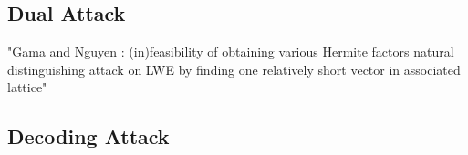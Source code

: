 














\subsection{Dual Attack \cite{MR09}}
"Gama and Nguyen \cite{GN08b}: (in)feasibility of obtaining various Hermite factors
natural distinguishing attack on LWE by finding one relatively short vector in associated lattice"




\subsection{Decoding Attack \cite{LP11}} \label{sec:decoding}

